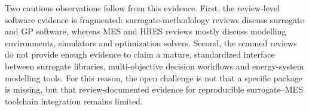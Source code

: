 Two cautious observations follow from this evidence. First, the review-level
software evidence is fragmented: surrogate-methodology reviews discuss
surrogate and GP software, whereas MES and HRES reviews mostly discuss
modelling environments, simulators and optimization solvers. Second, the
scanned reviews do not provide enough evidence to claim a mature,
standardized interface between surrogate libraries, multi-objective decision
workflows and energy-system modelling tools. For this reason, the open
challenge is not that a specific package is missing, but that
review-documented evidence for reproducible surrogate--MES toolchain
integration remains limited.
